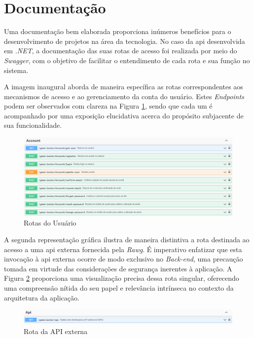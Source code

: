 \section{Documentação}

Uma documentação bem elaborada proporciona inúmeros benefícios para o desenvolvimento de projetos na área da tecnologia. No caso da \ac{api} desenvolvida em \textit{\gls{.NET}}, a documentação das suas rotas de acesso foi realizada por meio do \textit{\gls{Swagger}}, com o objetivo de facilitar o entendimento de cada rota e sua função no sistema.

A imagem inaugural aborda de maneira específica as rotas correspondentes aos mecanismos de acesso e ao gerenciamento da conta do usuário. Estes \textit{\gls{Endpoints}} podem ser observados com clareza na Figura \ref{RotasAccount}, sendo que cada um é acompanhado por uma exposição elucidativa acerca do propósito subjacente de sua funcionalidade.

\begin{figure}[H]
    \centering
	\caption{Rotas do Usuário}
    \label{RotasAccount}
    \includegraphics[scale = 0.38]{imagens/arquitetura/rotas_account.png}	
\end{figure}

A segunda representação gráfica ilustra de maneira distintiva a rota destinada ao acesso a uma \ac{api} externa fornecida pela \textit{\gls{Rawg}}. É imperativo enfatizar que esta invocação à \ac{api} externa ocorre de modo exclusivo no \textit{\gls{Back-end}}, uma precaução tomada em virtude das considerações de segurança inerentes à aplicação. A Figura \ref{RotasApi} proporciona uma visualização precisa dessa rota singular, oferecendo uma compreensão nítida do seu papel e relevância intrínseca no contexto da arquitetura da aplicação.

\begin{figure}[H]
    \centering
	\caption{Rota da API externa}
    \label{RotasApi}
    \includegraphics[scale = 0.38]{imagens/arquitetura/rotas_api.png}	
\end{figure}

